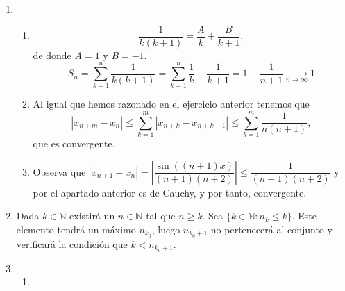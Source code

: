 \begin{enumerate}[label=\color{red}\textbf{\arabic*)}, leftmargin=*]
	\[ \begin{array}{c}
		|x_3-x_2|\le K|x_2-x_1|\\
		|x_4-x_3|\le K^2|x_2-x_1|\\
		|x_5-x_4|\le K^3|x_2-x_1|\\
		\\
		|x_{n+1}-x_n|\le K^3|x_2-x_1|\\
		\begin{aligned}
			|x_{n+m}-x_n|&\le|x_{n+m}-x_{n+m-1}|+|x_{n+m-1}-x_{n+m-2}|+\left|x_{n+m-2}-x_{n`m-3}\right|+\cdots+\left|x_{n+2}-x_{n+1}\right|+\left|x_{n+1}-x_n\right|\\
			&\le\left(K^{n+m-1}+K^{n+m-2}+K^{n+m-3}+\cdots+K^n\right)\left|x_2-x_1\right|\\
			&=\dfrac{K^n-K^{n+m}}{1-K}\left|x_2-x_1\right|
		\end{aligned}
	\end{array} \]
	Puesto que $K\in[0,1)$ podemos encontrar $n_0\in\mathbb{N}$ tal que $\dfrac{K^n-K^{n+m}}{1-K}|x_2-x_1|<\epsilon$ para $n\ge n_0$.
	\item \begin{enumerate}[label=\color{red}\arabic*)]
		\item {}
		
		\[ \dfrac{1}{k(k+1)}=\dfrac{A}{k}+\dfrac{B}{k+1}, \] de donde $A=1$ y $B=-1$. \[ S_n=\sum_{k=1}^{n}\dfrac{1}{k(k+1)}=\sum_{k=1}^{n}\dfrac{1}{k}-\dfrac{1}{k+1}=1-\dfrac{1}{n+1}\xrightarrow[n\to\infty]{}1 \]
		\item {}
		Al igual que hemos razonado en el ejercicio anterior tenemos que \[ \left|x_{n+m}-x_n\right| \le\sum_{k=1}^{m}\left|x_{n+k}-x_{n+k-1}\right|\le\sum_{k=1}^{m}\dfrac{1}{n(n+1)},\]que es convergente.
		\item {}
		
		Observa que $\left|x_{n+1}-x_n\right|=\left|\dfrac{\sin((n+1)x)}{(n+1)(n+2)}\right|\le\dfrac{1}{(n+1)(n+2)}$ y por el apartado anterior es de Cauchy, y por tanto, convergente.
\end{enumerate}
\item {}

Dada $k\in\mathbb{N}$ existirá un $n\in\mathbb{N}$ tal que $n\ge k$. Sea $\{k\in\mathbb{N}:n_k\le k\}$. Este elemento tendrá un máximo $n_{k_0}$, luego $n_{k_0+1}$ no pertenecerá al conjunto y verificará la condición que $k<n_{k_0+1}$.
\item {}
\begin{enumerate}[label=\color{red}\alph*)]
	\item {}
	

\end{enumerate}
\end{enumerate}
